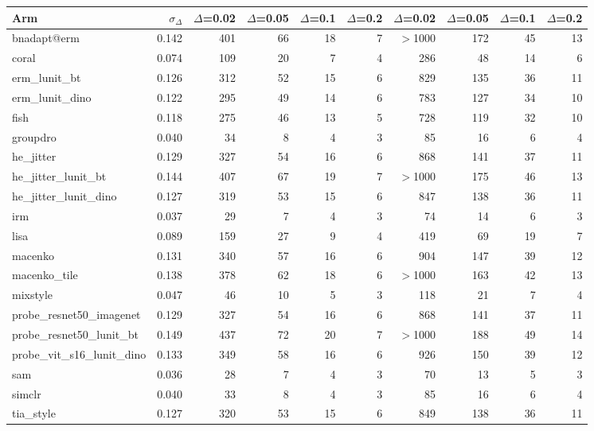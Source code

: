\begin{tabular}{lrrrrrrrrr}
\toprule
Arm & $\sigma_\Delta$ & $\Delta$=0.02 & $\Delta$=0.05 & $\Delta$=0.1 & $\Delta$=0.2 & $\Delta$=0.02 & $\Delta$=0.05 & $\Delta$=0.1 & $\Delta$=0.2 \\
\midrule
bnadapt@erm & 0.142 & 401 & 66 & 18 & 7 & $>$1000 & 172 & 45 & 13 \\
coral & 0.074 & 109 & 20 & 7 & 4 & 286 & 48 & 14 & 6 \\
erm\_lunit\_bt & 0.126 & 312 & 52 & 15 & 6 & 829 & 135 & 36 & 11 \\
erm\_lunit\_dino & 0.122 & 295 & 49 & 14 & 6 & 783 & 127 & 34 & 10 \\
fish & 0.118 & 275 & 46 & 13 & 5 & 728 & 119 & 32 & 10 \\
groupdro & 0.040 & 34 & 8 & 4 & 3 & 85 & 16 & 6 & 4 \\
he\_jitter & 0.129 & 327 & 54 & 16 & 6 & 868 & 141 & 37 & 11 \\
he\_jitter\_lunit\_bt & 0.144 & 407 & 67 & 19 & 7 & $>$1000 & 175 & 46 & 13 \\
he\_jitter\_lunit\_dino & 0.127 & 319 & 53 & 15 & 6 & 847 & 138 & 36 & 11 \\
irm & 0.037 & 29 & 7 & 4 & 3 & 74 & 14 & 6 & 3 \\
lisa & 0.089 & 159 & 27 & 9 & 4 & 419 & 69 & 19 & 7 \\
macenko & 0.131 & 340 & 57 & 16 & 6 & 904 & 147 & 39 & 12 \\
macenko\_tile & 0.138 & 378 & 62 & 18 & 6 & $>$1000 & 163 & 42 & 13 \\
mixstyle & 0.047 & 46 & 10 & 5 & 3 & 118 & 21 & 7 & 4 \\
probe\_resnet50\_imagenet & 0.129 & 327 & 54 & 16 & 6 & 868 & 141 & 37 & 11 \\
probe\_resnet50\_lunit\_bt & 0.149 & 437 & 72 & 20 & 7 & $>$1000 & 188 & 49 & 14 \\
probe\_vit\_s16\_lunit\_dino & 0.133 & 349 & 58 & 16 & 6 & 926 & 150 & 39 & 12 \\
sam & 0.036 & 28 & 7 & 4 & 3 & 70 & 13 & 5 & 3 \\
simclr & 0.040 & 33 & 8 & 4 & 3 & 85 & 16 & 6 & 4 \\
tia\_style & 0.127 & 320 & 53 & 15 & 6 & 849 & 138 & 36 & 11 \\
\bottomrule
\end{tabular}
